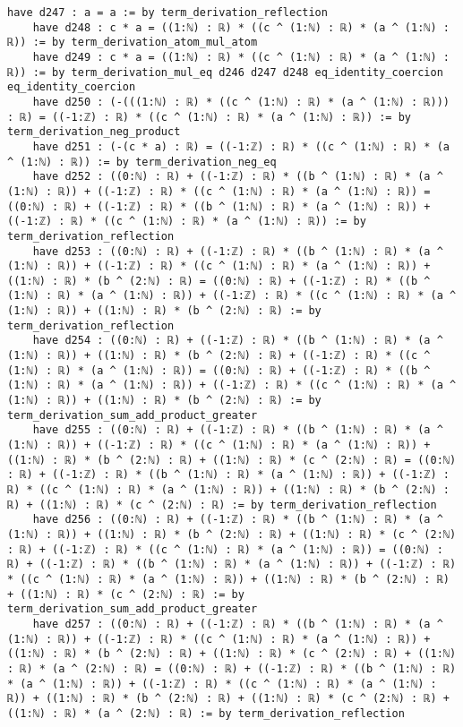 \documentclass{article}
\begin{document}
\begin{tcolorbox}[colback=white!10, width=\linewidth]
\begin{lstlisting}[language=Lean4]
    have d247 : a = a := by term_derivation_reflection
    have d248 : c * a = ((1:ℕ) : ℝ) * ((c ^ (1:ℕ) : ℝ) * (a ^ (1:ℕ) : ℝ)) := by term_derivation_atom_mul_atom
    have d249 : c * a = ((1:ℕ) : ℝ) * ((c ^ (1:ℕ) : ℝ) * (a ^ (1:ℕ) : ℝ)) := by term_derivation_mul_eq d246 d247 d248 eq_identity_coercion eq_identity_coercion
    have d250 : (-(((1:ℕ) : ℝ) * ((c ^ (1:ℕ) : ℝ) * (a ^ (1:ℕ) : ℝ))) : ℝ) = ((-1:ℤ) : ℝ) * ((c ^ (1:ℕ) : ℝ) * (a ^ (1:ℕ) : ℝ)) := by term_derivation_neg_product
    have d251 : (-(c * a) : ℝ) = ((-1:ℤ) : ℝ) * ((c ^ (1:ℕ) : ℝ) * (a ^ (1:ℕ) : ℝ)) := by term_derivation_neg_eq
    have d252 : ((0:ℕ) : ℝ) + ((-1:ℤ) : ℝ) * ((b ^ (1:ℕ) : ℝ) * (a ^ (1:ℕ) : ℝ)) + ((-1:ℤ) : ℝ) * ((c ^ (1:ℕ) : ℝ) * (a ^ (1:ℕ) : ℝ)) = ((0:ℕ) : ℝ) + ((-1:ℤ) : ℝ) * ((b ^ (1:ℕ) : ℝ) * (a ^ (1:ℕ) : ℝ)) + ((-1:ℤ) : ℝ) * ((c ^ (1:ℕ) : ℝ) * (a ^ (1:ℕ) : ℝ)) := by term_derivation_reflection
    have d253 : ((0:ℕ) : ℝ) + ((-1:ℤ) : ℝ) * ((b ^ (1:ℕ) : ℝ) * (a ^ (1:ℕ) : ℝ)) + ((-1:ℤ) : ℝ) * ((c ^ (1:ℕ) : ℝ) * (a ^ (1:ℕ) : ℝ)) + ((1:ℕ) : ℝ) * (b ^ (2:ℕ) : ℝ) = ((0:ℕ) : ℝ) + ((-1:ℤ) : ℝ) * ((b ^ (1:ℕ) : ℝ) * (a ^ (1:ℕ) : ℝ)) + ((-1:ℤ) : ℝ) * ((c ^ (1:ℕ) : ℝ) * (a ^ (1:ℕ) : ℝ)) + ((1:ℕ) : ℝ) * (b ^ (2:ℕ) : ℝ) := by term_derivation_reflection
    have d254 : ((0:ℕ) : ℝ) + ((-1:ℤ) : ℝ) * ((b ^ (1:ℕ) : ℝ) * (a ^ (1:ℕ) : ℝ)) + ((1:ℕ) : ℝ) * (b ^ (2:ℕ) : ℝ) + ((-1:ℤ) : ℝ) * ((c ^ (1:ℕ) : ℝ) * (a ^ (1:ℕ) : ℝ)) = ((0:ℕ) : ℝ) + ((-1:ℤ) : ℝ) * ((b ^ (1:ℕ) : ℝ) * (a ^ (1:ℕ) : ℝ)) + ((-1:ℤ) : ℝ) * ((c ^ (1:ℕ) : ℝ) * (a ^ (1:ℕ) : ℝ)) + ((1:ℕ) : ℝ) * (b ^ (2:ℕ) : ℝ) := by term_derivation_sum_add_product_greater
    have d255 : ((0:ℕ) : ℝ) + ((-1:ℤ) : ℝ) * ((b ^ (1:ℕ) : ℝ) * (a ^ (1:ℕ) : ℝ)) + ((-1:ℤ) : ℝ) * ((c ^ (1:ℕ) : ℝ) * (a ^ (1:ℕ) : ℝ)) + ((1:ℕ) : ℝ) * (b ^ (2:ℕ) : ℝ) + ((1:ℕ) : ℝ) * (c ^ (2:ℕ) : ℝ) = ((0:ℕ) : ℝ) + ((-1:ℤ) : ℝ) * ((b ^ (1:ℕ) : ℝ) * (a ^ (1:ℕ) : ℝ)) + ((-1:ℤ) : ℝ) * ((c ^ (1:ℕ) : ℝ) * (a ^ (1:ℕ) : ℝ)) + ((1:ℕ) : ℝ) * (b ^ (2:ℕ) : ℝ) + ((1:ℕ) : ℝ) * (c ^ (2:ℕ) : ℝ) := by term_derivation_reflection
    have d256 : ((0:ℕ) : ℝ) + ((-1:ℤ) : ℝ) * ((b ^ (1:ℕ) : ℝ) * (a ^ (1:ℕ) : ℝ)) + ((1:ℕ) : ℝ) * (b ^ (2:ℕ) : ℝ) + ((1:ℕ) : ℝ) * (c ^ (2:ℕ) : ℝ) + ((-1:ℤ) : ℝ) * ((c ^ (1:ℕ) : ℝ) * (a ^ (1:ℕ) : ℝ)) = ((0:ℕ) : ℝ) + ((-1:ℤ) : ℝ) * ((b ^ (1:ℕ) : ℝ) * (a ^ (1:ℕ) : ℝ)) + ((-1:ℤ) : ℝ) * ((c ^ (1:ℕ) : ℝ) * (a ^ (1:ℕ) : ℝ)) + ((1:ℕ) : ℝ) * (b ^ (2:ℕ) : ℝ) + ((1:ℕ) : ℝ) * (c ^ (2:ℕ) : ℝ) := by term_derivation_sum_add_product_greater
    have d257 : ((0:ℕ) : ℝ) + ((-1:ℤ) : ℝ) * ((b ^ (1:ℕ) : ℝ) * (a ^ (1:ℕ) : ℝ)) + ((-1:ℤ) : ℝ) * ((c ^ (1:ℕ) : ℝ) * (a ^ (1:ℕ) : ℝ)) + ((1:ℕ) : ℝ) * (b ^ (2:ℕ) : ℝ) + ((1:ℕ) : ℝ) * (c ^ (2:ℕ) : ℝ) + ((1:ℕ) : ℝ) * (a ^ (2:ℕ) : ℝ) = ((0:ℕ) : ℝ) + ((-1:ℤ) : ℝ) * ((b ^ (1:ℕ) : ℝ) * (a ^ (1:ℕ) : ℝ)) + ((-1:ℤ) : ℝ) * ((c ^ (1:ℕ) : ℝ) * (a ^ (1:ℕ) : ℝ)) + ((1:ℕ) : ℝ) * (b ^ (2:ℕ) : ℝ) + ((1:ℕ) : ℝ) * (c ^ (2:ℕ) : ℝ) + ((1:ℕ) : ℝ) * (a ^ (2:ℕ) : ℝ) := by term_derivation_reflection

\end{lstlisting}
\end{tcolorbox}
\end{document}
